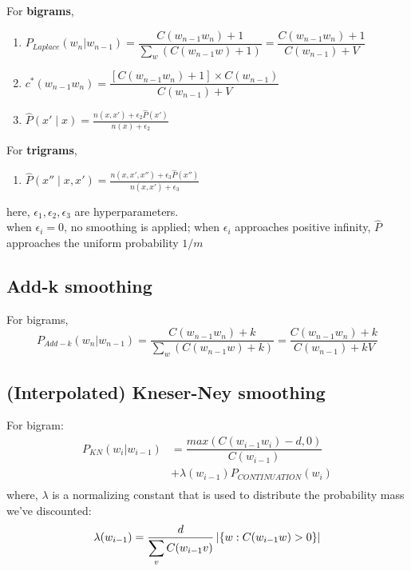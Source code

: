 \vspace{0.5cm}
\noindent
For \textbf{bigrams},

\begin{enumerate}[itemsep=0.15cm]
    \item $P_{Laplace}(w_n|w_{n-1}) = \dfrac{C(w_{n-1}w_n) + 1}{\sum_w (C(w_{n-1}w) + 1)} = \dfrac{C(w_{n-1}w_n) + 1}{C(w_{n-1}) + V} $

    \item $c^*(w_{n-1}w_n) = \dfrac{[C(w_{n-1}w_n)+1] \times C(w_{n-1})}{C(w_{n-1}) + V} $

    \item $\hat{P}(x' \mid x)  = \frac{n(x, x') + \epsilon_2 \hat{P}(x')}{n(x) + \epsilon_2}$ \hfill \cite{dnn-1}
\end{enumerate}

\vspace{0.5cm}
\noindent
For \textbf{trigrams},
\begin{enumerate}
    \item $\hat{P}(x'' \mid x,x') = \frac{n(x, x',x'') + \epsilon_3 \hat{P}(x'')}{n(x, x') + \epsilon_3}$ \hfill \cite{dnn-1}

\end{enumerate}

\vspace{0.5cm}
\noindent
here, $\epsilon_1,\epsilon_2, \epsilon_3$ are hyperparameters.\\
when $\epsilon_i = 0$, no smoothing is applied; when $\epsilon_i$ approaches positive infinity, $\hat{P}$ approaches the uniform probability $1/m$





\subsection{Add-k smoothing \cite{nlp-1}}

For bigrams,
\[
    P_{Add-k}(w_n|w_{n-1}) = \dfrac{C(w_{n-1}w_n) + k}{\sum_w (C(w_{n-1}w) + k)} = \dfrac{C(w_{n-1}w_n) + k}{C(w_{n-1}) + kV} 
\]

\subsection{(Interpolated) Kneser-Ney smoothing}

For bigram:
\begin{align*}
    P_{KN}(w_i|w_{i-1})  &= \dfrac{max(C(w_{i-1}w_i)-d,0)}{C(w_{i-1})} \\ 
    &+ \lambda (w_{i-1})P_{CONTINUATION}(w_i) \\ 
\end{align*}
where, $\lambda$ is a normalizing constant that is used to distribute the probability mass we’ve discounted:
\[
    \lambda(w_{i-1}) 
    = \dfrac{d}{\displaystyle\sum_v C(w_{i-1}v)} \left| \left\{w : C(w_{i-1}w) > 0\right\} \right|
\]

